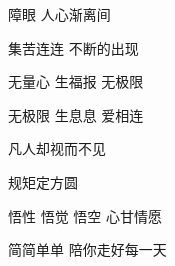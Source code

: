 \documentclass[12pt, a5paper]{extarticle}
\newenvironment{songverse}
{%
	\begin{samepage}%
	\begin{center}%
}{%
	\end{center}%
	\end{samepage}%
}
\begin{document}
\begin{pinyinscope}
\begin{songverse}
障眼 人心渐离间

集苦连连 不断的出现

\end{songverse}
\begin{songverse}

无量心 生福报 无极限

无极限 生息息 爱相连

凡人却视而不见

规矩定方圆

悟性 悟觉 悟空 心甘情愿

\end{songverse}
\begin{songverse}

简简单单 陪你走好每一天

\end{songverse}
\end{pinyinscope}
\end{document}
